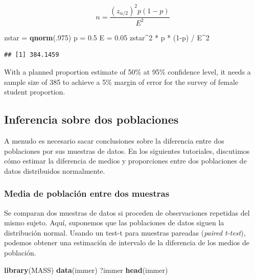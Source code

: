 \documentclass[]{article}
\newenvironment{Shaded}{\begin{snugshade}}{\end{snugshade}}
\newcommand{\KeywordTok}[1]{\textcolor[rgb]{0.13,0.29,0.53}{\textbf{{#1}}}}
\newcommand{\DecValTok}[1]{\textcolor[rgb]{0.00,0.00,0.81}{{#1}}}
\newcommand{\FloatTok}[1]{\textcolor[rgb]{0.00,0.00,0.81}{{#1}}}
\newcommand{\StringTok}[1]{\textcolor[rgb]{0.31,0.60,0.02}{{#1}}}
\newcommand{\NormalTok}[1]{{#1}}
\numberwithin{equation}{section}
\begin{document}
\[
   n  = \frac{(z_{\alpha/2})^2 p (1-p)}{E^2}
\]

\begin{Shaded}
\begin{Highlighting}[]
\NormalTok{zstar =}\StringTok{ }\KeywordTok{qnorm}\NormalTok{(.}\DecValTok{975}\NormalTok{) }
\NormalTok{p =}\StringTok{ }\FloatTok{0.5} 
\NormalTok{E =}\StringTok{ }\FloatTok{0.05} 
\NormalTok{zstar^}\DecValTok{2} \NormalTok{*}\StringTok{ }\NormalTok{p *}\StringTok{ }\NormalTok{(}\DecValTok{1}\NormalTok{-p) /}\StringTok{ }\NormalTok{E^}\DecValTok{2} 
\end{Highlighting}
\end{Shaded}

\begin{verbatim}
## [1] 384.1459
\end{verbatim}

With a planned proportion estimate of 50\% at 95\% confidence level, it
needs a sample size of 385 to achieve a 5\% margin of error for the
survey of female student proportion.

\subsection{Inferencia sobre dos
poblaciones}\label{inferencia-sobre-dos-poblaciones}

A menudo es necesario sacar conclusiones sobre la diferencia entre dos
poblaciones por sus muestras de datos. En los siguientes tutoriales,
discutimos cómo estimar la diferencia de medios y proporciones entre dos
poblaciones de datos distribuidos normalmente.

\subsubsection{Media de población entre dos
muestras}\label{media-de-poblacion-entre-dos-muestras}

Se comparan dos muestras de datos si proceden de observaciones repetidas
del mismo sujeto. Aquí, suponemos que las poblaciones de datos siguen la
distribución normal. Usando un test-t para muestras pareadas
(\emph{paired t-test}), podemos obtener una estimación de intervalo de
la diferencia de los medios de población.

\begin{Shaded}
\begin{Highlighting}[]
\KeywordTok{library}\NormalTok{(MASS)}
\KeywordTok{data}\NormalTok{(immer)}
\NormalTok{?immer}
\KeywordTok{head}\NormalTok{(immer)}
\end{Highlighting}
\end{Shaded}
\end{document}
